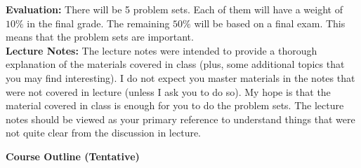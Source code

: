 \documentclass[11pt]{article}
\begin{document}
\noindent \textbf{Evaluation:} There will be 5 problem sets. Each of them will have a weight of $10\%$ in the final grade. The remaining $50\%$ will be based on a final exam. This means that the problem sets are important. \\ 

\noindent \textbf{Lecture Notes:} The lecture notes were intended to provide a thorough explanation of the materials covered in class (plus, some additional topics that you may find interesting). I do not expect you master materials in the notes that were not covered in lecture (unless I ask you to do so). My hope is that the material covered in class is enough for you to do the problem sets. The lecture notes should be viewed as your primary reference to understand things that were not quite clear from the discussion in lecture. 

\newpage

\textbf{Course Outline (Tentative)}
\end{document}
